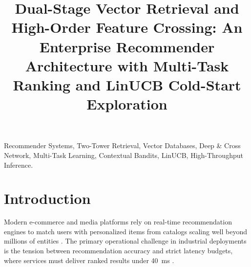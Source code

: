 \documentclass[conference]{IEEEtran}
\begin{document}
\title{Dual-Stage Vector Retrieval and High-Order Feature Crossing: An Enterprise Recommender Architecture with Multi-Task Ranking and LinUCB Cold-Start Exploration}

\author{
}

\maketitle

\begin{abstract}

\end{abstract}

\begin{IEEEkeywords}
Recommender Systems, Two-Tower Retrieval, Vector Databases, Deep \& Cross Network, Multi-Task Learning, Contextual Bandits, LinUCB, High-Throughput Inference.
\end{IEEEkeywords}

\section{Introduction}
Modern e-commerce and media platforms rely on real-time recommendation engines to match users with personalized items from catalogs scaling well beyond millions of entities \cite{covington2016deep,cheng2016wide}. The primary operational challenge in industrial deployments is the tension between recommendation accuracy and strict latency budgets, where services must deliver ranked results under 40~ms \cite{wang2021dcn,yi2019sampling}.
\end{document}
